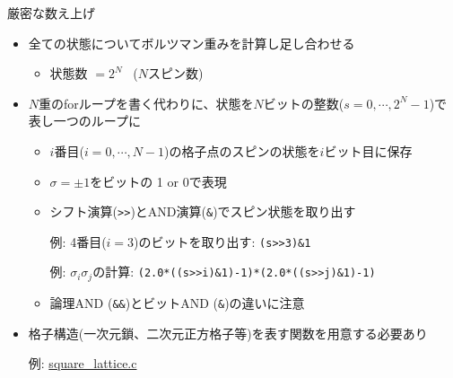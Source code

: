 
\begin{frame}[t,fragile]{厳密な数え上げ}
  \begin{itemize}
  \item 全ての状態についてボルツマン重みを計算し足し合わせる
    \begin{itemize}
    \item 状態数 $= 2^N$ \ ($N$スピン数)
    \end{itemize}
  \item $N$重のforループを書く代わりに、状態を{\color{red}$N$ビットの整数}($s=0,\cdots,2^N-1$)で表し一つのループに
    \begin{itemize}
    \item $i$番目($i=0,\cdots,N-1$)の格子点のスピンの状態を$i$ビット目に保存
    \item $\sigma = \pm 1$をビットの 1 or 0で表現
    \item シフト演算(\verb+>>+)とAND演算(\verb+&+)でスピン状態を取り出す

      例: 4番目($i=3$)のビットを取り出す: \verb+(s>>3)&1+

      例: $\sigma_i \sigma_j$の計算: \verb+(2.0*((s>>i)&1)-1)*(2.0*((s>>j)&1)-1)+

    \item 論理AND (\verb+&&+)とビットAND (\verb+&+)の違いに注意
    \end{itemize}
  \item 格子構造(一次元鎖、二次元正方格子等)を表す関数を用意する必要あり

    例:  \href{https://github.com/todo-group/computer-experiments/blob/master/exercise/monte_carlo/square_lattice.c}{square\_lattice.c}
  \end{itemize}
\end{frame}
